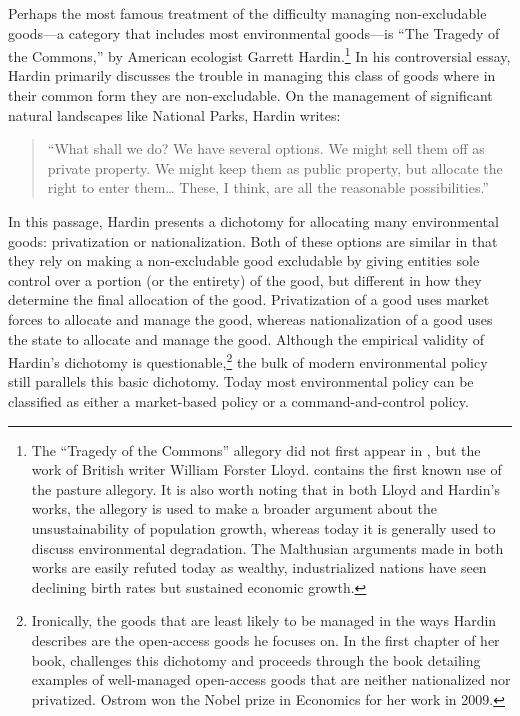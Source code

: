 Perhaps the most famous treatment of the difficulty managing non-excludable goods---a category that includes most environmental goods---is ``The Tragedy of the Commons,'' by American ecologist Garrett Hardin.\footnote{The ``Tragedy of the Commons'' allegory did not first appear in \cite{hardin1968tragedy}, but the work of British writer William Forster Lloyd. \cite{lloyd1833two}  contains the first known use of the pasture allegory. It is also worth noting that in both Lloyd and Hardin's works, the allegory is used to make a broader argument about the unsustainability of population growth, whereas today it is generally used to discuss environmental degradation. The Malthusian arguments made in both works are easily refuted today as wealthy, industrialized nations have seen declining birth rates but sustained economic growth.} In his controversial essay, Hardin primarily discusses the trouble in managing this class of goods where in their common form they are non-excludable. On the management of significant natural landscapes like National Parks,  Hardin writes:
\begin{quote}
``What shall we do? We have several options. We might sell them off as private property. We might keep them as public property, but allocate the right to enter them… These, I think, are all the reasonable possibilities.''
\end{quote}
In this passage, Hardin presents a dichotomy for allocating many environmental goods: privatization or nationalization. Both of these options are similar in that they rely on making a non-excludable good excludable by giving entities sole control over a portion (or the entirety) of the good, but different in how they determine the final allocation of the good. Privatization of a good uses market forces to allocate and manage the good, whereas nationalization of a good uses the state to allocate and manage the good. Although the empirical validity of Hardin's dichotomy is questionable,\footnote{Ironically, the goods that are least likely to be managed in the ways Hardin describes are the open-access goods he focuses on. In the first chapter of her book, \cite{ostrom1990governing} challenges this dichotomy and proceeds through the book detailing examples of well-managed open-access goods that are neither nationalized nor privatized. Ostrom won the Nobel prize in Economics for her work in 2009.} the bulk of modern environmental policy still parallels this basic dichotomy. Today most environmental policy can be classified as either a market-based policy or a command-and-control policy.

